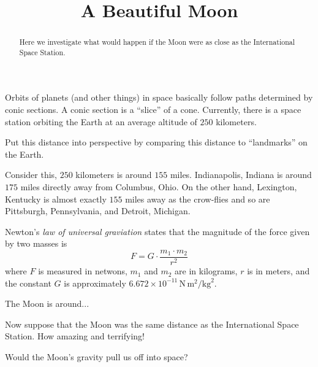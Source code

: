 \documentclass{ximera}
\title{A Beautiful Moon}
\begin{document}
\begin{abstract}
Here we investigate what would happen if the Moon were as close as the
International Space Station.
\end{abstract}
\maketitle

Orbits of planets (and other things) in space basically follow paths
determined by conic sections. A conic section is a ``slice'' of a
cone. Currently, there is a space station orbiting the Earth at an average
altitude of $250$ kilometers.

\begin{question}
Put this distance into perspective by comparing this distance to
``landmarks'' on the Earth.
\begin{solution}
\begin{freeResponse}
Consider this, $250$ kilometers is around $155$ miles. Indianapolis,
Indiana is around $175$ miles directly away from Columbus, Ohio. On
the other hand, Lexington, Kentucky is almost exactly $155$ miles away
as the crow-flies and so are Pittsburgh, Pennsylvania, and Detroit,
Michigan.
\end{freeResponse}
\end{solution}
\end{question}


Newton's \textit{law of universal graviation} states that the
magnitude of the force given by two masses is
\[
F = G \cdot \frac{m_1\cdot m_2}{r^2} 
\]
where $F$ is measured in netwons, $m_1$ and $m_2$ are in kilograms, $r$ is in meters, and the constant $G$ is approximately $6.672\times 10^{-11}\, \mathrm{N}\, \mathrm{m}^2/\mathrm{kg}^2$. 

The Moon is around...


Now suppose that the Moon was the same distance as the International
Space Station. How amazing and terrifying!

\begin{question}
Would the Moon's gravity pull us off into space? 
\end{question}
\end{document}
